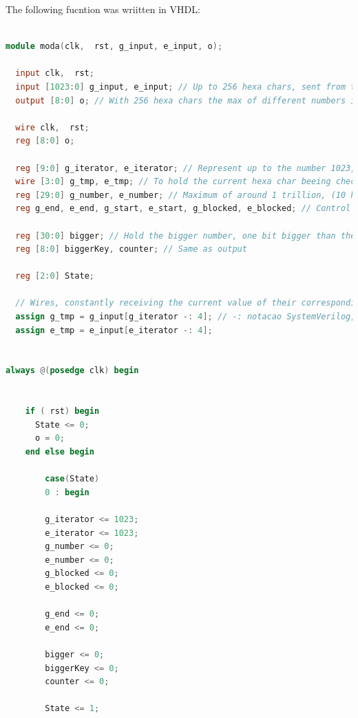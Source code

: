\begin{refsection}
The following fucntion was wriitten in VHDL:

\begin{lstlisting}[caption={moda.vhd}, language=Verilog, captionpos=b] 

module moda(clk,  rst, g_input, e_input, o);

  input clk,  rst;
  input [1023:0] g_input, e_input; // Up to 256 hexa chars, sent from the testbench
  output [8:0] o; // With 256 hexa chars the max of different numbers is 512 (256 / 2 (commas) * 4)

  wire clk,  rst;
  reg [8:0] o;

  reg [9:0] g_iterator, e_iterator; // Represent up to the number 1023, to iterate the inputs
  wire [3:0] g_tmp, e_tmp; // To hold the current hexa char beeing checked
  reg [29:0] g_number, e_number; // Maximum of around 1 trillion, (10 hexa digits, because in bcd)
  reg g_end, e_end, g_start, e_start, g_blocked, e_blocked; // Control registers

  reg [30:0] bigger; // Hold the bigger number, one bit bigger than the biggest number for the inputs
  reg [8:0] biggerKey, counter; // Same as output

  reg [2:0] State; 

  // Wires, constantly receiving the current value of their corresponding input with the current interator
  assign g_tmp = g_input[g_iterator -: 4]; // -: notacao SystemVerilog, ver se funcioa com yosys 
  assign e_tmp = e_input[e_iterator -: 4];


always @(posedge clk) begin

	
    if ( rst) begin
      State <= 0;
      o = 0;
    end else begin

	    case(State)
	    0 : begin

		g_iterator <= 1023;
		e_iterator <= 1023;
		g_number <= 0;
		e_number <= 0;
		g_blocked <= 0;
		e_blocked <= 0;

		g_end <= 0;
		e_end <= 0;

		bigger <= 0;
		biggerKey <= 0;
		counter <= 0;

		State <= 1;


\end{lstlisting}
\end{refsection}

